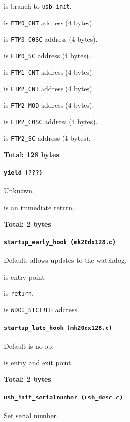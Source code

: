  is branch to \texttt{usb\_init}.

\vspace{1em}

 is \texttt{FTM0\_CNT} address (4 bytes).

 is \texttt{FTM0\_C0SC} address (4 bytes).

 is \texttt{FTM0\_SC} address (4 bytes).

 is \texttt{FTM1\_CNT} address (4 bytes).

 is \texttt{FTM2\_CNT} address (4 bytes).

 is \texttt{FTM2\_MOD} address (4 bytes).

 is \texttt{FTM2\_C0SC} address (4 bytes).

 is \texttt{FTM2\_SC} address (4 bytes).

\textbf{Total: 128 bytes}

\paragraph{\texttt{yield (???)}} Unknown.

 is an immediate return.

\textbf{Total: 2 bytes}

\paragraph{\texttt{startup\_early\_hook (mk20dx128.c)}} Default, allows updates
to the watchdog.

 is entry point.

 is \texttt{return}.

 is \texttt{WDOG\_STCTRLH} address.

\paragraph{\texttt{startup\_late\_hook (mk20dx128.c)}} Default is no-op.

 is entry and exit point.

\textbf{Total: 2 bytes}

\paragraph{\texttt{usb\_init\_serialnumber (usb\_desc.c)}} Set serial number.

